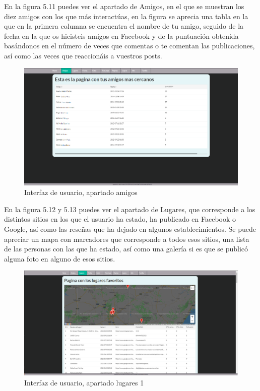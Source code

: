 \color{black}
En la figura 5.11 puedes ver el apartado de Amigos, en el que se muestran los diez amigos con los que más interactúas, en la figura se aprecia una tabla en la que en la primera columna se encuentra el nombre de tu amigo, seguido de la fecha en la que os hicisteis amigos en Facebook y de la puntuación obtenida basándonos en el número de veces que comentas o te comentan las publicaciones, así como las veces que reaccionáis a vuestros posts.
\begin{figure}
	\begin{center}
		\includegraphics[scale=0.3]{Imagenes/Fuentes/InterfazAmigos.png} \caption{Interfaz de usuario, apartado amigos}
		\label{WebAplication2}
	\end{center}
\end{figure}
En la figura 5.12 y 5.13 puedes ver el apartado de Lugares, que corresponde a los distintos sitios en los que el usuario ha estado, ha publicado en Facebook o Google, así como las reseñas que ha dejado en algunos establecimientos. Se puede apreciar un mapa con marcadores que corresponde a todos esos sitios, una lista de las personas con las que ha estado, así como una galería si es que se publicó alguna foto en alguno de esos sitios.
\begin{figure}
	\begin{center}
		\includegraphics[scale=0.3]{Imagenes/Fuentes/InterfazLugares1.png} \caption{Interfaz de usuario, apartado lugares 1}
		\label{WebAplication3}
	\end{center}
\end{figure}
